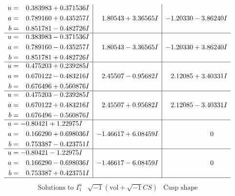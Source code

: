 \documentclass[1p]{elsarticle_modified}
\theoremstyle{definition}
\newcommand{\I}{\sqrt{-1}}
\begin{document}
$$\begin{array}{c|c|c}
\begin{aligned}
u &= \phantom{-}0.383983 + 0.371536 I \\
a &= \phantom{-}0.789160 + 0.435257 I \\
b &= \phantom{-}0.851781 - 0.482726 I\end{aligned}
 & \phantom{-}1.80543 + 3.36565 I & -1.20330 - 3.86240 I \\ \hline\begin{aligned}
u &= \phantom{-}0.383983 - 0.371536 I \\
a &= \phantom{-}0.789160 - 0.435257 I \\
b &= \phantom{-}0.851781 + 0.482726 I\end{aligned}
 & \phantom{-}1.80543 - 3.36565 I & -1.20330 + 3.86240 I \\ \hline\begin{aligned}
u &= \phantom{-}0.475203 + 0.239285 I \\
a &= \phantom{-}0.670122 - 0.483216 I \\
b &= \phantom{-}0.676496 + 0.560876 I\end{aligned}
 & \phantom{-}2.45507 - 0.95682 I & \phantom{-}2.12085 + 3.40331 I \\ \hline\begin{aligned}
u &= \phantom{-}0.475203 - 0.239285 I \\
a &= \phantom{-}0.670122 + 0.483216 I \\
b &= \phantom{-}0.676496 - 0.560876 I\end{aligned}
 & \phantom{-}2.45507 + 0.95682 I & \phantom{-}2.12085 - 3.40331 I \\ \hline\begin{aligned}
u &= -0.80421 + 1.22975 I \\
a &= \phantom{-}0.166290 + 0.698036 I \\
b &= \phantom{-}0.753387 - 0.423751 I\end{aligned}
 & -1.46617 + 6.08459 I & \phantom{-0.000000 } 0 \\ \hline\begin{aligned}
u &= -0.80421 - 1.22975 I \\
a &= \phantom{-}0.166290 - 0.698036 I \\
b &= \phantom{-}0.753387 + 0.423751 I\end{aligned}
 & -1.46617 - 6.08459 I & \phantom{-0.000000 } 0\\
 \hline 
 \end{array}$$\newpage$$\begin{array}{c|c|c}  
\text{Solutions to }I^u_{1}& \I (\text{vol} + \sqrt{-1}CS) & \text{Cusp shape}\\

\end{array}$$
\end{document}
